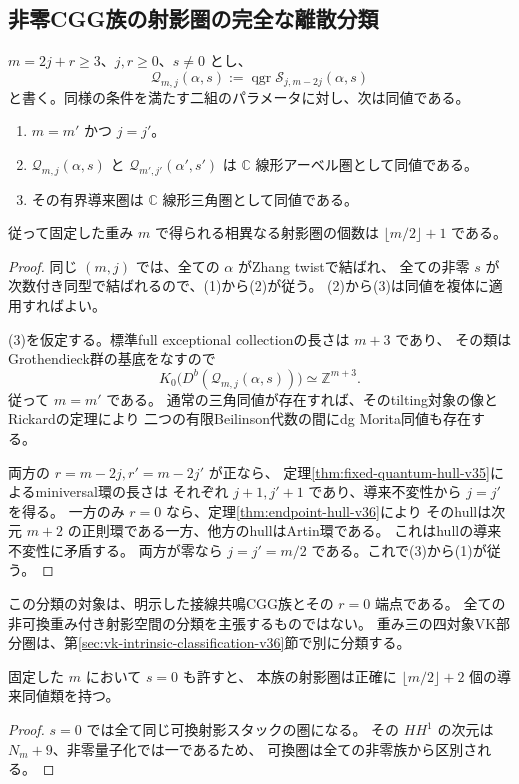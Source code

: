 \subsection{非零CGG族の射影圏の完全な離散分類}

\begin{theorem}[本族内部での射影圏の同値分類]
\label{thm:CGG-categorical-classification-v35}
$m=2j+r\ge3$、$j,r\ge0$、$s\ne0$ とし、
\[
 \mathcal Q_{m,j}(\alpha,s)
 :=\operatorname{qgr}\mathcal S_{j,m-2j}(\alpha,s)
\]
と書く。同様の条件を満たす二組のパラメータに対し、次は同値である。
\begin{enumerate}
\item $m=m'$ かつ $j=j'$。
\item $\mathcal Q_{m,j}(\alpha,s)$ と
 $\mathcal Q_{m',j'}(\alpha',s')$ は $\mathbb C$ 線形アーベル圏として同値である。
\item その有界導来圏は $\mathbb C$ 線形三角圏として同値である。
\end{enumerate}
従って固定した重み $m$ で得られる相異なる射影圏の個数は
$\lfloor m/2\rfloor+1$ である。
\end{theorem}

\begin{proof}
同じ $(m,j)$ では、全ての $\alpha$ がZhang twistで結ばれ、
全ての非零 $s$ が次数付き同型で結ばれるので、(1)から(2)が従う。
(2)から(3)は同値を複体に適用すればよい。

(3)を仮定する。標準full exceptional collectionの長さは $m+3$ であり、
その類はGrothendieck群の基底をなすので
\[
 K_0\bigl(D^b(\mathcal Q_{m,j}(\alpha,s))\bigr)
 \simeq\mathbb Z^{m+3}.
\]
従って $m=m'$ である。
通常の三角同値が存在すれば、そのtilting対象の像とRickardの定理により
二つの有限Beilinson代数の間にdg Morita同値も存在する。

両方の $r=m-2j,r'=m-2j'$ が正なら、
定理\ref{thm:fixed-quantum-hull-v35}によるminiversal環の長さは
それぞれ $j+1,j'+1$ であり、導来不変性から $j=j'$ を得る。
一方のみ $r=0$ なら、定理\ref{thm:endpoint-hull-v36}により
そのhullは次元 $m+2$ の正則環である一方、他方のhullはArtin環である。
これはhullの導来不変性に矛盾する。
両方が零なら $j=j'=m/2$ である。これで(3)から(1)が従う。
\end{proof}

この分類の対象は、明示した接線共鳴CGG族とその $r=0$ 端点である。
全ての非可換重み付き射影空間の分類を主張するものではない。
重み三の四対象VK部分圏は、第\ref{sec:vk-intrinsic-classification-v36}節で別に分類する。

\begin{corollary}[可換点を含めた族]固定した $m$ において $s=0$ も許すと、
本族の射影圏は正確に $\lfloor m/2\rfloor+2$ 個の導来同値類を持つ。
\end{corollary}
\begin{proof}$s=0$ では全て同じ可換射影スタックの圏になる。
その $HH^1$ の次元は $N_m+9$、非零量子化では一であるため、
可換圏は全ての非零族から区別される。\end{proof}
